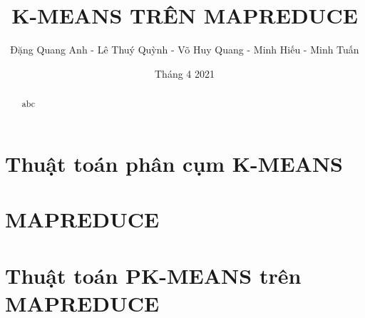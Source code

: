 \documentclass[12pt]{beamer}
\begin{document}
	\author{Đặng Quang Anh - Lê Thuý Quỳnh - Võ Huy Quang - Minh Hiếu - Minh Tuấn}
	\title{K-MEANS TRÊN MAPREDUCE}
	\date{Tháng 4 2021}
	\maketitle
	\begin{abstract}
		abc
	\end{abstract}
	\section{Thuật toán phân cụm K-MEANS}
	
	\section{MAPREDUCE}
	
	\section{Thuật toán PK-MEANS trên MAPREDUCE}
\end{document}
